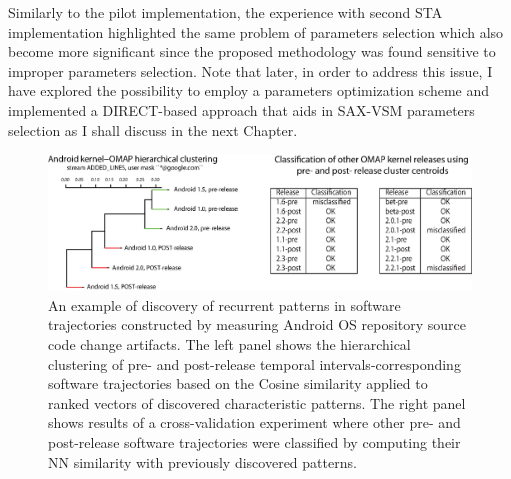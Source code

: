 Similarly to the pilot implementation, the experience with second STA implementation highlighted the same problem of 
parameters selection which also become more significant since the proposed methodology was found sensitive to improper parameters 
selection. Note that later, in order to address this issue, I have explored the possibility to employ a parameters optimization 
scheme and implemented a DIRECT-based approach \cite{citeulike:12563460} that aids in SAX-VSM parameters selection as 
I shall discuss in the next Chapter.

\begin{figure}[t]
   \centering
   \includegraphics[width=145mm]{figures/STA2-draft.eps}
   \caption{An example of discovery of recurrent patterns in software trajectories constructed by measuring Android OS 
   repository source code change artifacts.
   The left panel shows the hierarchical clustering of pre- and post-release temporal intervals-corresponding software 
   trajectories based on the Cosine similarity applied to ranked vectors of discovered characteristic patterns.
   The right panel shows results of a cross-validation experiment where other pre- and post-release software trajectories 
   were classified by computing their NN similarity with previously discovered patterns.}
   \label{fig:STA2-results}
\end{figure}

